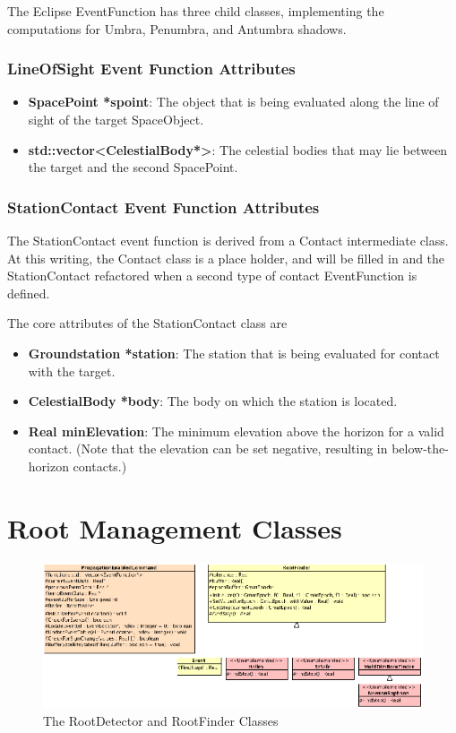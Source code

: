 \documentclass[letterpaper,10pt]{article}
\begin{document}
\noindent The Eclipse EventFunction has three child classes, implementing the
computations for Umbra, Penumbra, and Antumbra shadows.

\subsubsection{LineOfSight Event Function Attributes}

\begin{itemize}
\item \textbf{SpacePoint *spoint}:  The object that is being evaluated along the
line of sight of the target SpaceObject.
\item \textbf{std::vector\textless CelestialBody*\textgreater}:  The celestial
bodies that may lie between the target and the second SpacePoint.
\end{itemize}

\subsubsection{StationContact Event Function Attributes}

The StationContact event function is derived from a Contact intermediate class.
 At this writing, the Contact class is a place holder, and will be filled in
and the StationContact refactored when a second type of contact EventFunction
is defined.

The core attributes of the StationContact class are

\begin{itemize}
\item \textbf{Groundstation *station}:  The station that is being evaluated for
contact with the target.
\item \textbf{CelestialBody *body}:  The body on which the station is located.
\item \textbf{Real minElevation}:  The minimum elevation above the horizon for
a valid contact.  (Note that the elevation can be set negative, resulting in
below-the-horizon contacts.)
\end{itemize}

\section{Root Management Classes}

\begin{figure}[ht]
\begin{center}
\includegraphics[scale=1.7]{./Images/RootFinders.eps}
\caption{\label{fig:RootFinders}The RootDetector and RootFinder Classes}
\end{center}
\end{figure}
\end{document}
